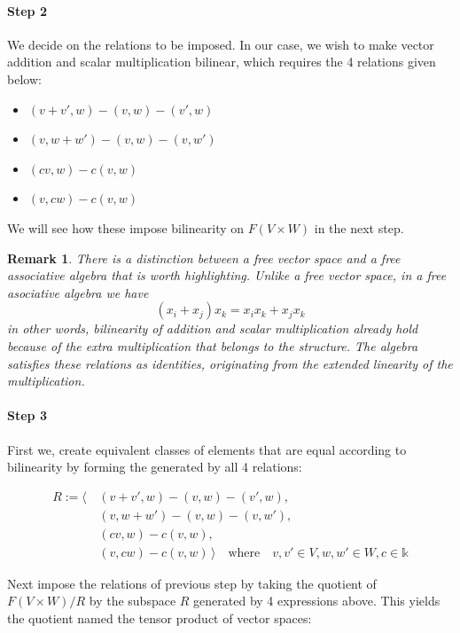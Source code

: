 \documentclass[12pt]{article}
\newtheorem{remark}[theorem]{Remark}
\numberwithin{theorem}{section}
\numberwithin{equation}{theorem}
\newcommand{\kk}{\mathds{k}}
\begin{document}
\paragraph{Step 2}
We decide on the relations to be imposed. In our case, we wish to make vector addition and scalar multiplication bilinear, which requires the 4 relations given below:

\begin{itemize}
    \item $(v + v', w) - (v, w) - (v', w)$
    \item $(v, w + w') - (v, w) - (v, w')$
    \item $(cv, w) - c(v, w)$
    \item $(v, cw) - c(v, w)$
\end{itemize}

We will see how these impose bilinearity on $F(V \times W)$ in the next step.

\begin{remark}
    There is a distinction between a free vector space and a free associative algebra that is worth highlighting. Unlike a free vector space, in a free asociative algebra we have $$(x_i+x_j)x_k = x_ix_k + x_jx_k$$ in other words, bilinearity of addition and scalar multiplication already hold because of the extra multiplication that belongs to the structure. The algebra satisfies these relations as identities, originating from the extended linearity of the multiplication.
\end{remark}

\paragraph{Step 3}
First we, create equivalent classes of elements that are equal according to bilinearity by forming the generated by all 4 relations:

\begin{align*}
    R := \langle\, &(v + v', w) - (v, w) - (v', w), \\
    &(v, w + w') - (v, w) - (v, w'), \\
    &(cv, w) - c(v, w), \\
    &(v, cw) - c(v, w) \, \rangle \quad \text{where} \quad v, v' \in V, w, w' \in W, c \in \kk
\end{align*}

Next impose the relations of previous step by taking the quotient of $F(V \times W)/R$ by the subspace $R$ generated by 4 expressions above. This yields the quotient named the tensor product of vector spaces:
\end{document}
